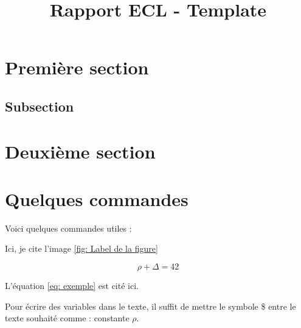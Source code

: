 \documentclass{rapportECL}
\title{Rapport ECL - Template} %
\begin{document}




        
\fairemarges %
\fairepagedegarde %
\tabledematieres %



\section{Première section} 

\lipsum[3-4]%

\subsection{Subsection}

\lipsum[3-4] %

\section{Deuxième section}

\lipsum[3-5] %


\section{Quelques commandes}

Voici quelques commandes utiles :


Ici, je cite l'image \ref{fig: Label de la figure}



\begin{equation} \label{eq: exemple}
\rho + \Delta = 42
\end{equation}

L'équation \ref{eq: exemple} est cité ici. 


Pour écrire des variables dans le texte, il suffit de mettre le symbole \$ entre le texte souhaité comme : constante $\rho$. 
\end{document}
